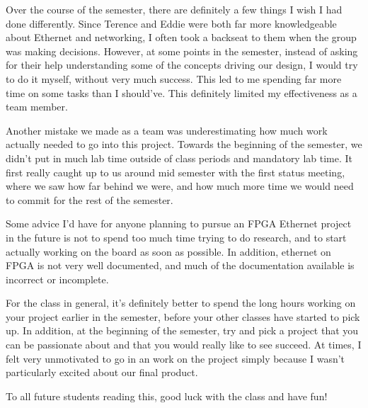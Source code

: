 \documentclass[12pt]{report}
\begin{document}
Over the course of the semester, there are definitely a few things I wish I had done differently. Since Terence and Eddie were both far more knowledgeable about Ethernet and networking, I often took a backseat to them when the group was making decisions. However, at some points in the semester, instead of asking for their help understanding some of the concepts driving our design, I would try to do it myself, without very much success. This led to me spending far more time on some tasks than I should've. This definitely limited my effectiveness as a team member.

Another mistake we made as a team was underestimating how much work actually needed to go into this project. Towards the beginning of the semester, we didn't put in much lab time outside of class periods and mandatory lab time. It first really caught up to us around mid semester with the first status meeting, where we saw how far behind we were, and how much more time we would need to commit for the rest of the semester.

Some advice I'd have for anyone planning to pursue an FPGA Ethernet project in the future is not to spend too much time trying to do research, and to start actually working on the board as soon as possible. In addition, ethernet on FPGA is not very well documented, and much of the documentation available is incorrect or incomplete.

For the class in general, it's definitely better to spend the long hours working on your project earlier in the semester, before your other classes have started to pick up. In addition, at the beginning of the semester, try and pick a project that you can be passionate about and that you would really like to see succeed. At times, I felt very unmotivated to go in an work on the project simply because I wasn't particularly excited about our final product.

To all future students reading this, good luck with the class and have fun!

\printbibliography
\end{document}
